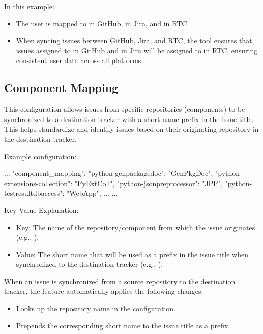 In this example:
\begin{itemize}
    \item The user  is mapped to  in
          GitHub,  in Jira, and  in RTC.
    \item When syncing issues between GitHub, Jira, and RTC, the tool ensures
          that issues assigned to  in GitHub and
           in Jira will be assigned to  in RTC,
          ensuring consistent user data across all platforms.
\end{itemize}

\subsection{Component Mapping}
This configuration allows issues from specific repositories (components) to be
synchronized to a destination tracker with a short name prefix in the issue
title.
This helps standardize and identify issues based on their originating repository
in the destination tracker.

Example configuration:
\begin{pythoncode}
{
   ...
   "component_mapping": {
      "python-genpackagedoc": "GenPkgDoc",
      "python-extensions-collection": "PyExtColl",
      "python-jsonpreprocessor": "JPP",
      "python-testresultdbaccess": "WebApp",
      ...
   }
   ...
}
\end{pythoncode}

Key-Value Explanation:
\begin{itemize}
   \item Key: The name of the repository/component from which the issue
         originates (e.g., ).
   \item Value: The short name that will be used as a prefix in the issue title
         when synchronized to the destination tracker (e.g., ).
\end{itemize}

When an issue is synchronized from a source repository to the destination
tracker, the feature automatically applies the following changes:
\begin{itemize}
   \item Looks up the repository name in the  configuration.
   \item Prepends the corresponding short name to the issue title as a prefix.
\end{itemize}

